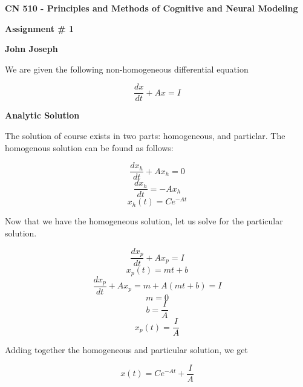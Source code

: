 \documentclass[a4paper,12pt]{article}
\begin{document}
\begin{center}
{\Large\bf CN 510 - Principles and Methods of Cognitive and Neural Modeling}

\bigskip

{\large\bf Assignment \# 1}
\smallskip

{\large\bf John Joseph}
\end{center}

We are given the following non-homogeneous differential equation

\begin{equation}
\frac{dx}{dt} + Ax = I
\end{equation}

\bigskip
{\bf Analytic Solution}
\bigskip

The solution of course exists in two parts: homogeneous, and particlar. The homogenous solution can be found as follows:

\begin{equation}
\frac{dx_h}{dt} + Ax_h = 0
\end{equation}
\begin{equation}
\frac{dx_h}{dt} = -Ax_h
\end{equation}
\begin{equation}
x_h(t) = Ce^{-At}
\end{equation} 

Now that we have the homogeneous solution, let us solve for the particular solution. 

\begin{equation}
\frac{dx_p}{dt} + Ax_p = I
\end{equation}
\begin{equation}
x_p(t) = mt+b
\end{equation}
\begin{equation}
\frac{dx_p}{dt} + Ax_p = m + A(mt+b) = I
\end{equation}
\begin{equation}
m = 0
\end{equation}
\begin{equation}
b = \frac{I}{A}
\end{equation}
\begin{equation}
x_p(t) = \frac{I}{A}
\end{equation}

Adding together the homogeneous and particular solution, we get

\begin{equation}
x(t) = Ce^{-At} + \frac{I}{A}
\end{equation}
\end{document}
